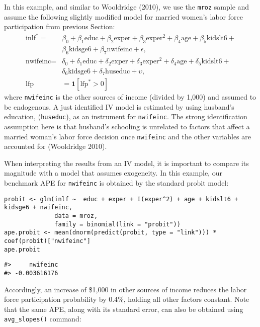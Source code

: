 In this example, and similar to Wooldridge (2010), we use the \texttt{mroz} sample and assume the following slightly modified model for married women's labor force participation from previous Section:
\begin{align*}
  \text{inlf}^* = &  \beta_0 + \beta_1\text{educ} + \beta_2 \text{exper} + \beta_3\text{exper}^2+\beta_4\text{age}+\beta_5 \text{kidslt6} +\\
                    &  \beta_6 \text{kidsge6}+\beta_7\text{nwifeinc}+ \epsilon, \\
  \text{nwifeinc} = & \delta_0 + \delta_1\text{educ} + \delta_2 \text{exper} + \delta_3\text{exper}^2+\delta_4\text{age}+\delta_5 \text{kidslt6} +\\
                    &  \delta_6 \text{kidsge6}+\delta_7\text{huseduc}+ \upsilon, \\          \text{lfp}   & =  \mathbf{1}\left[\text{lfp}^* > 0\right]
\end{align*}
where \texttt{nwifeinc} is the other sources of income (divided by 1,000) and assumed to be endogenous. A just identified IV model is estimated by using husband's education, (\texttt{huseduc}), as an instrument for \texttt{nwifeinc}. The strong identification assumption here is that husband's schooling is unrelated to factors that affect a married woman's labor force decision once \texttt{nwifeinc} and the other variables are accounted for (Wooldridge 2010).

When interpreting the results from an IV model, it is important to compare its magnitude with a model that assumes exogeneity. In this example, our benchmark APE for \texttt{nwifeinc} is obtained by the standard probit model:

\begin{verbatim}
probit <- glm(inlf ~  educ + exper + I(exper^2) + age + kidslt6 + kidsge6 + nwifeinc, 
              data = mroz, 
              family = binomial(link = "probit"))
ape.probit <- mean(dnorm(predict(probit, type = "link"))) * coef(probit)["nwifeinc"]
ape.probit
\end{verbatim}

\begin{verbatim}
#>     nwifeinc 
#> -0.003616176
\end{verbatim}

Accordingly, an increase of \$1,000 in other sources of income reduces the labor force participation probability by 0.4\%, holding all other factors constant. Note that the same APE, along with its standard error, can also be obtained using \texttt{avg\_slopes()} command:


